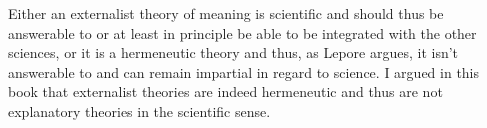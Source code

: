 Either an externalist theory of meaning is scientific and should thus be answerable to or at least in principle be able to be integrated with the other sciences, or it is a hermeneutic theory and thus, as Lepore argues, it isn’t answerable to and can remain impartial in regard to science. I argued in this book that externalist theories are indeed hermeneutic and thus are not explanatory theories in the scientific sense. 

